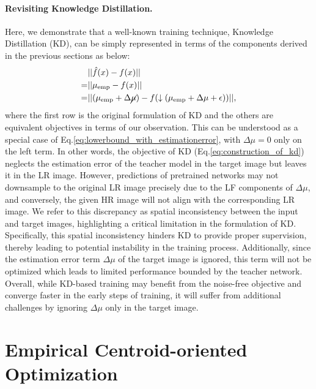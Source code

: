 \documentclass[letterpaper]{article} %
\begin{document}
\paragraph{Revisiting Knowledge Distillation.}
Here, we demonstrate that a well-known training technique, Knowledge Distillation (KD), can be simply represented in terms of the components derived in the previous sections as below:
\begin{equation}
        \label{eq:construction_of_kd}
        \begin{aligned}
        &||\hat{f}(x) - f(x)|| \\
        =&||\mu_{\text{emp}} - f(x)|| \\
        =&||(\mu_{\text{emp}} + \Delta\cancel{\mu}) - f(\downarrow(\mu_{\text{emp}} + \Delta\mu + \epsilon))||
        ,
        \end{aligned}
\end{equation}
where the first row is the original formulation of KD and the others are equivalent objectives in terms of our observation.
%
This can be understood as a special case of Eq.\eqref{eq:lowerbound_with_estimationerror}, with $\Delta \mu = 0$ only on the left term. In other words, the objective of KD (Eq.\eqref{eq:construction_of_kd}) neglects the estimation error of the teacher model in the target image but leaves it in the LR image.
%
However, predictions of pretrained networks may not downsample to the original LR image precisely due to the LF components of
$\Delta \mu$, and conversely, the given HR image will not align with the corresponding LR image.
%
We refer to this discrepancy as spatial inconsistency between the input and target images, highlighting a critical limitation in the formulation of KD.
Specifically, this spatial inconsistency hinders KD to provide proper supervision, thereby leading to potential instability in the training process.
%
Additionally, since the estimation error term $\Delta \mu$ of the target image is ignored, this term will not be optimized which leads to limited performance bounded by the teacher network.
%
Overall, while KD-based training may benefit from the noise-free objective and converge faster in the early steps of training, it will suffer from additional challenges by ignoring $\Delta \mu$ only in the target image.





\section{Empirical Centroid-oriented Optimization} \label{sec:ecoo_method}
\end{document}
